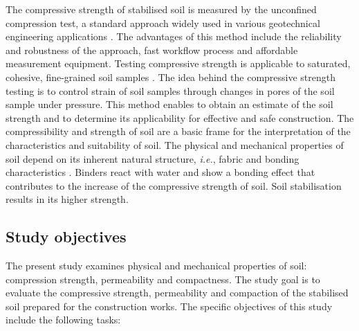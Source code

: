 \documentclass{amestyle}
\begin{document}
The compressive strength of stabilised soil is measured by the unconfined compression test, a standard approach widely used in various geotechnical engineering applications \cite{SHIBI20211123,KARDANI2021100591}. The advantages of this method include the reliability and robustness of the approach, fast workflow process and affordable measurement equipment. Testing compressive strength is applicable to saturated, cohesive, fine-grained soil samples \cite{MOUSAVI2021104890,AHMED201527}. The idea behind the compressive strength testing is to control strain of soil samples through changes in pores of the soil sample under pressure. This method enables to obtain an estimate of the soil strength and to determine its applicability for effective and safe construction. The compressibility and strength of soil are a basic frame for the interpretation of the characteristics and suitability of soil. The physical and mechanical properties of soil depend on its inherent natural structure, \emph{i.e.}, fabric and bonding characteristics \cite{Burland}. Binders react with water and show a bonding effect that contributes to the increase of the compressive strength of soil. Soil stabilisation results in its higher strength.

\subsection{Study objectives} 
The present study examines physical and mechanical properties of soil: compression strength, permeability and compactness. The study goal is to evaluate the compressive strength, permeability and compaction of the stabilised soil prepared for the construction works. The specific objectives of this study include the following tasks:
\end{document}
